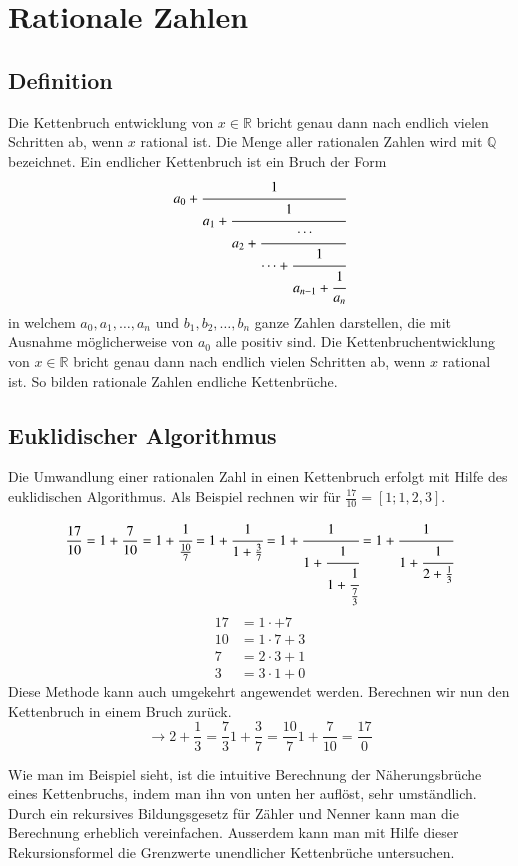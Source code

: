
%
%
%
\section{Rationale Zahlen
\label{kettenbruch:section:Zahlen}}
\subsection{Definition}
Die Kettenbruch entwicklung von $x \in \mathbb{R}$ bricht genau dann nach endlich
vielen Schritten ab, wenn $x$ rational ist.
Die Menge aller rationalen Zahlen wird mit $\mathbb{Q}$ bezeichnet.
Ein endlicher Kettenbruch ist ein Bruch der Form
\begin{equation}
a_0 + \cfrac{1}{a_1+\cfrac{1}{a_2+\cfrac{\cdots}{\cdots+\cfrac{1}{a_{n-1} + \cfrac{1}{a_n}}}}}
\end{equation}
in welchem $a_0, a_1,\dots,a_n$ und $b_1,b_2,\dots,b_n$ ganze Zahlen
darstellen, die mit Ausnahme möglicherweise von $a_0$ alle positiv sind.
Die Kettenbruchentwicklung von $x \in \mathbb{R}$ bricht genau dann
nach endlich vielen Schritten ab, wenn $x$ rational ist. So bilden
rationale Zahlen endliche Kettenbrüche.

\subsection{Euklidischer Algorithmus}
Die Umwandlung einer rationalen Zahl in einen Kettenbruch erfolgt
mit Hilfe des euklidischen Algorithmus.
Als Beispiel rechnen wir für $\frac{17}{10} = [1;1,2,3]$.
\begin{beispiel}
\begin{equation}
\frac{17}{10}
=
1 + \frac{7}{10}
=
1 + \cfrac{1}{\frac{10}{7}}
=
1 + \cfrac{1}{1+\frac{3}{7}}
=
1 + \cfrac{1}{1+\cfrac{1}{1+\cfrac{1}{\frac{7}{3}}}}
=
1 + \cfrac{1}{1+\cfrac{1}{2+\frac{1}{3}}}
\end{equation}
\begin{align*}
17 &= 1\cdot + 7 \\
10 &= 1\cdot 7 + 3 \\
7 &= 2\cdot 3 + 1 \\
3 &= 3\cdot 1 + 0
\end{align*}
Diese Methode kann auch umgekehrt angewendet werden.
Berechnen wir nun den Kettenbruch in einem Bruch zurück.
\begin{equation}
[1;1,2,3] \rightarrow	2 + \frac{1}{3} = \frac{7}{3}
						1 + \frac{3}{7} = \frac{10}{7}
						1 + \frac{7}{10} = \frac{17}{0}
\end{equation}
\end{beispiel}
Wie man im Beispiel sieht, ist die intuitive Berechnung der
Näherungsbrüche eines Kettenbruchs, indem man ihn von unten her
auflöst, sehr umständlich. Durch ein rekursives Bildungsgesetz für
Zähler und Nenner kann man die Berechnung erheblich vereinfachen.
Ausserdem kann man mit Hilfe dieser Rekursionsformel die Grenzwerte
unendlicher Kettenbrüche untersuchen.

